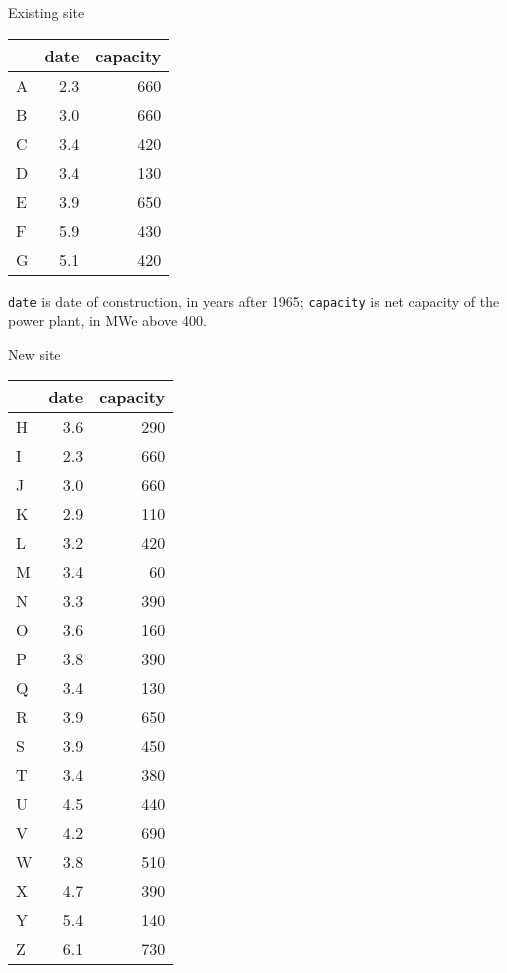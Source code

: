 \documentclass[12pt,twoside]{article}
\begin{document}
{{\bigskip

\begin{minipage}[t]{.4\textwidth}
\begin{center} 
Existing site\\
{%
\begin{tabular}{lrr}
\hline
 & date & capacity \\
\hline
A & 2.3 & {660}  \\
B & 3.0 & {660}  \\
C & 3.4 & {420}  \\
D & 3.4 & {130}  \\
E & 3.9 & {650}  \\
F & 5.9 & {430}  \\
G & 5.1 & {420}  \\
\hline
\end{tabular}}
\end{center}
\bigskip
\bigskip
{\footnotesize \texttt{date} is date of construction, in years after
1965; \texttt{capacity} is net capacity of the power plant, in MWe above
400.}
\end{minipage}
\begin{minipage}[t]{.4\textwidth}
\begin{center} 
New site\\
{\footnotesize
\begin{tabular}{lrr}
\hline
 & date & capacity \\
\hline
 {H} & 3.6 & 290 \\
 {I} & 2.3 & 660 \\
 {J} & 3.0 & 660 \\
 {K} & 2.9 & 110 \\
 {L} & 3.2 & 420 \\
 {M} & 3.4 &  60 \\
 {N} & 3.3 & 390 \\
 {O} & 3.6 & 160 \\
 {P} & 3.8 & 390 \\
 {Q} & 3.4 & 130 \\
 {R} & 3.9 & 650 \\
 {S} & 3.9 & 450 \\
 {T} & 3.4 & 380 \\
 {U} & 4.5 & 440 \\
 {V} & 4.2 & 690 \\
 {W} & 3.8 & 510 \\
 {X} & 4.7 & 390 \\
 {Y} & 5.4 & 140 \\
 {Z} & 6.1 & 730 \\
\hline
\end{tabular}}
\end{center}
\end{minipage}


}}
\end{document}
